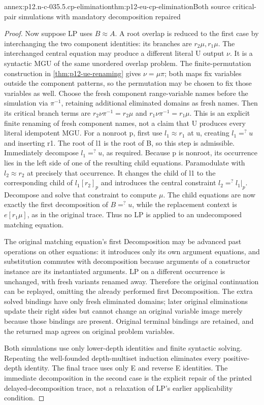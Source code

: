 \begin{annexitem}{annex:p12.n-c-035.5.cp-elimination}{thm:p12-eu-cp-elimination}{Both source critical-pair simulations with mandatory decomposition repaired}
\begin{proof}
Now suppose LP uses \(B\approx A\). A root overlap is reduced
to the first case by interchanging the two component identities:
its branches are \(r_2\mu,r_1\mu\). The interchanged central
equation may produce a different literal U output \(\nu\).
It is a syntactic MGU of the same unordered overlap problem.
The finite-permutation construction in \cref{thm:p12-ue-renaming}
gives \(\nu=\mu\pi\); both maps fix variables outside the
component patterns, so the permutation may be chosen to fix those
variables as well. Choose the fresh component range-variable names
before the simulation via \(\pi^{-1}\), retaining additional
eliminated domains as fresh names. Then its critical branch terms
are \(r_2\nu\pi^{-1}=r_2\mu\) and
\(r_1\nu\pi^{-1}=r_1\mu\). This is an explicit finite
renaming of fresh component names, not a claim that U produces
every literal idempotent MGU. For a nonroot p, first
use \(l_1\approx r_1\) at u, creating \(l_1=^{?}u\) and
inserting r1. The root of l1 is the root of B, so this step is
admissible. Immediately decompose \(l_1=^{?}u\), as required.
Because p is nonroot, its occurrence lies in the left side of one
of the resulting child equations. Paramodulate with
\(l_2\approx r_2\) at precisely that occurrence. It changes
the child of l1 to the corresponding child of \(l_1[r_2]_p\)
and introduces the central constraint
\(l_2=^{?}l_1|_p\). Decompose and solve that constraint to
compute \(\mu\). The child equations are now exactly the
first decomposition of \(B=^{?}u\), while the replacement
context is \(e[r_1\mu]\), as in the original trace.
Thus no LP is applied to an undecomposed matching equation.

The original matching equation's first Decomposition may be advanced
past operations on other equations: it introduces only its own
argument equations, and substitution commutes with decomposition
because arguments of a constructor instance are its instantiated
arguments. LP on a different occurrence is unchanged, with fresh
variants renamed away. Therefore the original continuation can be
replayed, omitting the already performed first Decomposition.
The extra solved bindings have only fresh eliminated domains;
later original eliminations update their right sides but cannot
change an original variable image merely because those bindings
are present. Original terminal bindings are retained, and the
returned map agrees on original problem variables.

Both simulations use only lower-depth identities and finite
syntactic solving. Repeating the well-founded depth-multiset
induction eliminates every positive-depth identity. The final
trace uses only E and reverse E identities. The immediate
decomposition in the second case is the explicit repair of the
printed delayed-decomposition trace, not a relaxation of LP's
earlier applicability condition.
\end{proof}
\end{annexitem}

